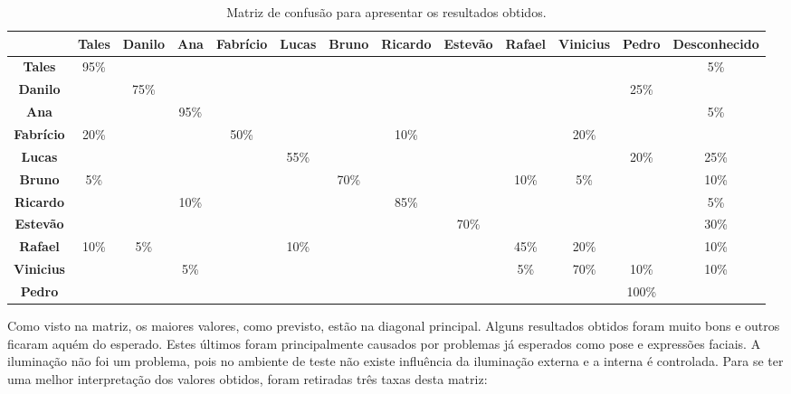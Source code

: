 	\begin{landscape}
	\begin{table}[htb]
		\begin{center}
			\caption{Matriz de confusão para apresentar os resultados obtidos.}
			\label{tab:matriz-confusao}
			\begin{tabular}{|c|c|c|c|c|c|c|c|c|c|c|c|c|}
				\hline  & \bf Tales & \bf Danilo & \bf Ana & \bf Fabrício & \bf Lucas & \bf Bruno & \bf Ricardo & \bf Estevão & \bf Rafael & \bf Vinicius & \bf Pedro & \bf Desconhecido\\
				\hline \bf Tales 		& 95\% & 			& 		 & 			&   	 & 			& 		 & 			& 		 & 			& 		 & 5\%	\\
				\hline \bf Danilo 	& 		 & 75\% & 		 & 			&   	 & 			& 		 & 			& 		 & 			& 25\% &		 	\\
				\hline \bf Ana 			& 		 & 			& 95\% & 			&   	 & 			& 		 & 			& 		 & 			& 		 & 5\%  \\
				\hline \bf Fabrício & 20\% & 			& 		 & 50\% &      & 			& 10\% & 			&  	   & 20\% & 		 &		  \\
				\hline \bf Lucas 		& 		 & 			& 		 & 			& 55\% & 			& 		 & 			& 		 & 			& 20\% & 25\% \\
				\hline \bf Bruno 		& 5\%	 & 			& 		 & 			& 		 & 70\% & 		 & 			& 10\% & 	5\%	& 		 & 10\%	\\
				\hline \bf Ricardo 	& 		 & 			& 10\% & 			& 		 & 			& 85\% & 			& 		 & 			& 		 & 5\%  \\
				\hline \bf Estevão 	& 		 & 			& 		 & 			& 		 & 			& 		 & 70\% & 		 & 			& 		 & 30\% \\
				\hline \bf Rafael 	& 10\% & 	5\%	& 		 & 			& 10\% & 			& 		 & 			& 45\% & 20\% & 		 & 10\% \\
				\hline \bf Vinicius & 		 & 			& 5\%  & 			& 		 & 			& 		 & 			& 5\%  & 70\% & 10\% & 10\% \\
				\hline \bf Pedro 		& 		 & 			& 		 & 			& 		 & 			& 		 & 			& 		 & 			& 100\%&		  \\
				\hline
			\end{tabular}
		\end{center}
	\end{table}
	\end{landscape}

	Como visto na matriz, os maiores valores, como previsto, estão na diagonal principal. Alguns resultados obtidos foram muito bons e outros ficaram aquém do esperado. Estes últimos foram principalmente causados por problemas já esperados como pose e expressões faciais. A iluminação não foi um problema, pois no ambiente de teste não existe influência da iluminação externa e a interna é controlada. Para se ter uma melhor interpretação dos valores obtidos, foram retiradas três taxas desta matriz:

